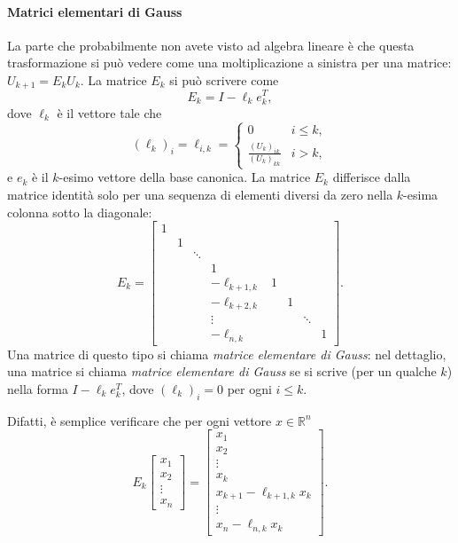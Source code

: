 \documentclass[a4paper]{report}
\theoremstyle{definiton}
\theoremstyle{remark}
\newcommand{\x}{\mathbf{x}}
\begin{document}
\paragraph{Matrici elementari di Gauss} La parte che probabilmente non avete visto ad algebra lineare è che questa trasformazione si può vedere come una moltiplicazione a sinistra per una matrice: $U_{k+1} = E_k U_k$. La matrice $E_k$ si può scrivere come
\[
E_k = I - \ell_k e_k^T,
\]
dove $\ell_k$ è il vettore tale che 
\[
(\ell_k)_i = \ell_{i,k} = \begin{cases}
0 & i \leq k,\\
\frac{(U_k)_{ik}}{(U_k)_{kk}} & i>k,
\end{cases}
\]
e $e_k$ è il $k$-esimo vettore della base canonica. La matrice $E_k$ differisce dalla matrice identità solo per una sequenza di elementi diversi da zero nella $k$-esima colonna sotto la diagonale:
\[
E_k = \begin{bmatrix}
    1 \\
    & 1\\
    && \ddots\\
    & & & 1\\
    & & & -\ell_{k+1,k} & 1\\
    & & & -\ell_{k+2,k} & & 1\\
    & & & \vdots & & & \ddots \\
    & & & -\ell_{n,k} & & & & 1
\end{bmatrix}.
\]
Una matrice di questo tipo si chiama \emph{matrice elementare di Gauss}: nel dettaglio, una matrice si chiama \emph{matrice elementare di Gauss} se si scrive (per un qualche $k$) nella forma $I - \ell_k e_k^T$, dove $(\ell_k)_i = 0$ per ogni $i\leq k$.

Difatti, è semplice verificare che per ogni vettore $x\in\mathbb{R}^n$ 
\[
E_k \begin{bmatrix}
    x_1\\x_2\\ \vdots \\ x_n
\end{bmatrix}
=
\begin{bmatrix}
    x_1 \\ x_2\\ \vdots \\ x_k \\ x_{k+1} - \ell_{k+1,k}x_k\\
    \vdots \\
    x_n - \ell_{n,k}x_k
\end{bmatrix}.
\]
\end{document}
